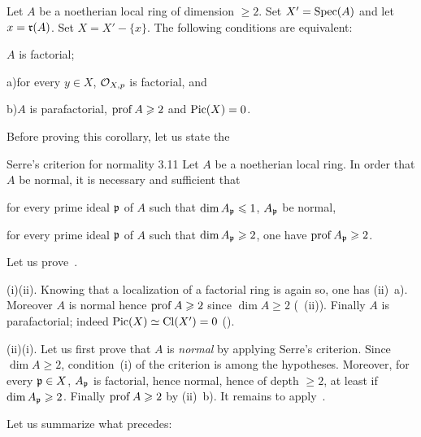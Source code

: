 \begin{corollary} \label{XI.3.10}
Let $A$ be a noetherian local ring of dimension $\geq 2$. Set $X'=\operatorname{Spec}(A)$ and let $x = \mathfrak{r}(A)$. Set $X=X'-\{x\}$. The following conditions are equivalent:
\begin{enumeratei}
\item
$A$ is factorial;
\item
\textup{a)}\enspace for every $y\in X$, ${\mathcal O}_{X, p}$ is factorial, and
\par\hspace*{6.3mm}\textup{b)}\enspace $A$ is parafactorial, \ie $\operatorname{prof} A\geqslant 2$ and $\operatorname{Pic}(X)=0$.
\end{enumeratei}
\end{corollary}

Before proving this corollary, let us state the
\label{XI.3.11}
\begin{enonce*}{Serre's criterion for normality 3.11\sfootnotemark} Let $A$ be a noetherian local ring. In order that $A$ be normal, it is necessary and sufficient that
\begin{enumeratei}
\item
for every prime ideal ${\mathfrak{p}}$ of $A$ such that $\dim A_{{\mathfrak{p}}}\leqslant 1$, $A_{{\mathfrak{p}}}$ be normal,
\item
for every prime ideal ${\mathfrak{p}}$ of $A$ such that $\dim A_{{\mathfrak{p}}}\geqslant 2$, one have $\operatorname{prof} A_{{\mathfrak{p}}}\geqslant 2$.
\end{enumeratei}
\end{enonce*}

Let us prove~.

(i)\ALORS (ii). Knowing that a localization of a factorial ring is again so, one has (ii)~a). Moreover $A$ is normal hence $\operatorname{prof} A\geqslant 2$ since $\dim A\geq 2$ (~(ii)). Finally $A$ is parafactorial; indeed $\operatorname{Pic}(X)\simeq\operatorname{Cl}(X')=0$ (\cf {}).

(ii)\ALORS (i). Let us first prove that $A$ is \emph{normal} by applying Serre's criterion. Since $\dim A\geq 2$, condition~(i) of the criterion is among the hypotheses. Moreover, for every ${\mathfrak{p}}\in X$, $A_{{\mathfrak{p}}}$ is factorial, hence normal, hence of depth $\geq 2$, at least if $\dim A_{{\mathfrak{p}}}\geqslant 2$. Finally $\operatorname{prof} A\geqslant 2$ by (ii)~b). It remains to apply~.

\smallskip
Let us summarize what precedes:

